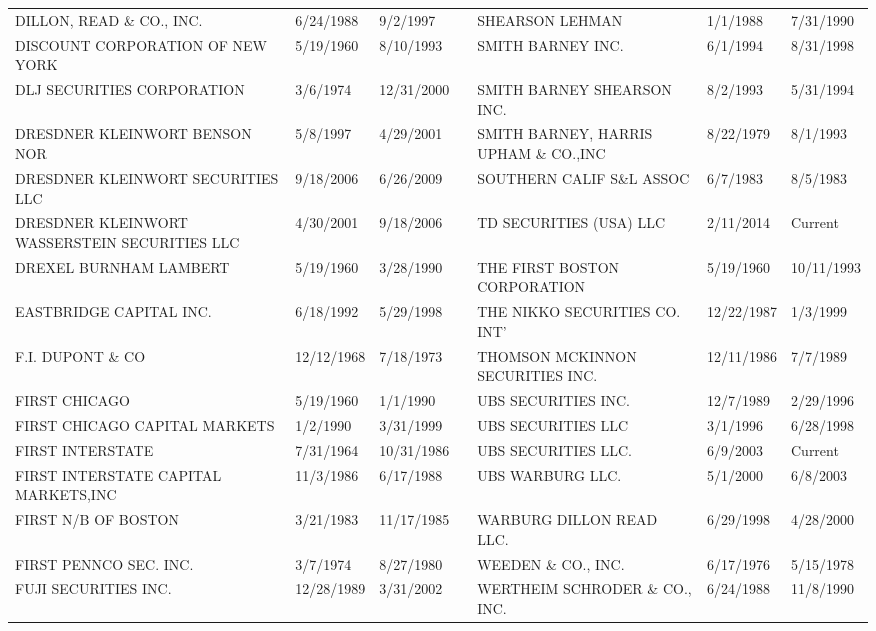 \begin{tabular}{lllllll}
DILLON, READ \& CO., INC.            & 6/24/1988 & 9/2/1997 &  & SHEARSON LEHMAN                      & 1/1/1988 & 7/31/1990 \\
DISCOUNT CORPORATION OF NEW YORK     & 5/19/1960 & 8/10/1993 &  & SMITH BARNEY INC.                    & 6/1/1994 & 8/31/1998 \\
DLJ SECURITIES CORPORATION          & 3/6/1974 & 12/31/2000 &  & SMITH BARNEY SHEARSON INC.           & 8/2/1993 & 5/31/1994 \\
DRESDNER KLEINWORT BENSON NOR   & 5/8/1997 & 4/29/2001 &  & SMITH BARNEY, HARRIS UPHAM \& CO.,INC & 8/22/1979 & 8/1/1993 \\
DRESDNER KLEINWORT SECURITIES LLC & 9/18/2006 & 6/26/2009 &  & SOUTHERN CALIF S\&L ASSOC            & 6/7/1983 & 8/5/1983 \\
DRESDNER KLEINWORT WASSERSTEIN SECURITIES LLC & 4/30/2001 & 9/18/2006 &  & TD SECURITIES (USA) LLC & 2/11/2014 & Current \\
DREXEL BURNHAM LAMBERT              & 5/19/1960 & 3/28/1990 &  & THE FIRST BOSTON CORPORATION        & 5/19/1960 & 10/11/1993 \\
EASTBRIDGE CAPITAL INC.              & 6/18/1992 & 5/29/1998 &  & THE NIKKO SECURITIES CO. INT'       & 12/22/1987 & 1/3/1999 \\
F.I. DUPONT \& CO                     & 12/12/1968 & 7/18/1973 &  & THOMSON MCKINNON SECURITIES INC.    & 12/11/1986 & 7/7/1989 \\
FIRST CHICAGO                       & 5/19/1960 & 1/1/1990 &  & UBS SECURITIES INC.                 & 12/7/1989 & 2/29/1996 \\
FIRST CHICAGO CAPITAL MARKETS       & 1/2/1990 & 3/31/1999 &  & UBS SECURITIES LLC                  & 3/1/1996 & 6/28/1998 \\
FIRST INTERSTATE                     & 7/31/1964 & 10/31/1986 &  & UBS SECURITIES LLC.                 & 6/9/2003 & Current \\
FIRST INTERSTATE CAPITAL MARKETS,INC & 11/3/1986 & 6/17/1988 &  & UBS WARBURG LLC.                    & 5/1/2000 & 6/8/2003 \\
FIRST N/B OF BOSTON                  & 3/21/1983 & 11/17/1985 &  & WARBURG DILLON READ LLC.            & 6/29/1998 & 4/28/2000 \\
FIRST PENNCO SEC. INC.               & 3/7/1974 & 8/27/1980 &  & WEEDEN \& CO., INC.                   & 6/17/1976 & 5/15/1978 \\
FUJI SECURITIES INC.                & 12/28/1989 & 3/31/2002 &  & WERTHEIM SCHRODER \& CO., INC.        & 6/24/1988 & 11/8/1990 \\

\end{tabular}
